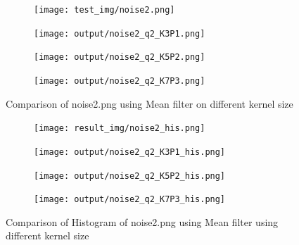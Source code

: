 \documentclass[12pt,a4paper]{report}
\begin{document}
\begin{figure}[!htb]
  \begin{minipage}{\linewidth}
    \centering
    \begin{subfigure}{0.49\textwidth}
      \texttt{[image: test\_img/noise2.png]}
    \end{subfigure}
    \begin{subfigure}{0.49\textwidth}
      \texttt{[image: output/noise2\_q2\_K3P1.png]}
    \end{subfigure}

    \begin{subfigure}{0.49\textwidth}
      \texttt{[image: output/noise2\_q2\_K5P2.png]}
    \end{subfigure}
    \begin{subfigure}{0.49\textwidth}
      \texttt{[image: output/noise2\_q2\_K7P3.png]}
    \end{subfigure}

  \caption{Comparison of noise2.png using Mean filter on different kernel size}
  \end{minipage}

\end{figure}
\begin{figure}[!htb]
  \begin{minipage}{\linewidth}
    \centering
    \begin{subfigure}{1\textwidth}
      \texttt{[image: result\_img/noise2\_his.png]}
    \end{subfigure}
    \begin{subfigure}{1\textwidth}
      \texttt{[image: output/noise2\_q2\_K3P1\_his.png]}
    \end{subfigure}

    \begin{subfigure}{1\textwidth}
      \texttt{[image: output/noise2\_q2\_K5P2\_his.png]}
    \end{subfigure}
    \begin{subfigure}{1\textwidth}
      \texttt{[image: output/noise2\_q2\_K7P3\_his.png]}
    \end{subfigure}
    
  \caption{Comparison of Histogram of noise2.png using Mean filter using different kernel size}
\label{fig:n2-median-hist}
\end{minipage}
\end{figure}
\clearpage
\end{document}
